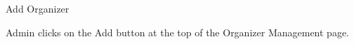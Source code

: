 
\begin{uc}{Add Organizer}

    
    \begin{uc-trig}
        Admin clicks on the Add button at the top of the Organizer Management
        page.
    \end{uc-trig}
\end{uc}

